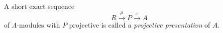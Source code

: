 A short exact sequence
$$R \xrightarrow{\mu} P \xrightarrow{\varepsilon} A$$
of $\Lambda$-modules with $P$ projective is called a \textit{projective presentation} of $A$.
